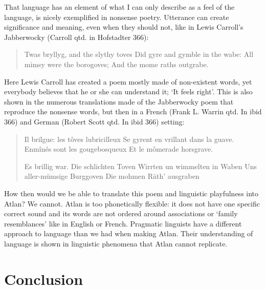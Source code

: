That language has an element of what I can only describe as a feel of the language, is nicely exemplified in nonsense poetry. Utterance can create significance and meaning, even when they should not, like in Lewis Carroll’s Jabberwocky (Carroll qtd. in Hofstadter 366):

\begin{quote}
Twas bryllyg, and the slythy toves 
 Did gyre and gymble in the wabe: 
 All mimsy were the borogoves; 
 And the mome raths outgrabe.  
\end{quote}

\noindent Here Lewis Carroll has created a poem mostly made of non-existent words, yet everybody believes that he or she can understand it; ‘It feels right\rq. This is also shown in the numerous translations made of the Jabberwocky poem that reproduce the nonsense words, but then in a French (Frank L. Warrin qtd. In ibid 366) and German (Robert Scott qtd. In ibid 366) setting: 

\begin{quote}
Il brilgue: les t\^{o}ves lubricilleux 
Se gyrent en vrillant dans la guave. 
Enm\^{i}n\'{e}s sont les gougebosqueux 
Et le m\^{o}merade horsgrave.  

Es brillig war. Die schlichten Toven 
Wirrten un wimmelten in Waben 
Uns aller-m\"{u}msige Burggoven 
Die mohmen R\"{a}th’ ausgraben 
\end{quote}

\noindent How then would we be able to translate this poem and linguistic playfulness into Atlan? We cannot. Atlan is too phonetically flexible: it does not have one specific correct sound and its words are not ordered around  associations or ‘family resemblances’ like in English or French. Pragmatic linguists have a different approach to language than we had when making Atlan. Their understanding of language is shown in linguistic phenomena that Atlan cannot replicate.   

\section{Conclusion}

